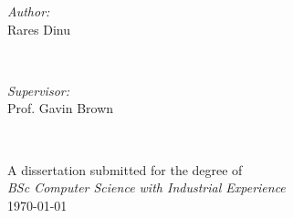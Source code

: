 \begin{titlepage}
\begin{minipage}{0.4\textwidth}
\begin{flushleft} \large
\emph{Author:}\\
Rares Dinu %
\end{flushleft}
\end{minipage}
~
\begin{minipage}{0.4\textwidth}
\begin{flushright} \large
\emph{Supervisor:} \\
Prof. Gavin Brown 
\end{flushright}
\end{minipage}\\[3cm]
\makeatother



{\large A dissertation submitted for the degree of}\\[0.2cm]
{\large \emph{BSc Computer Science with Industrial Experience}}\\[1cm]
{\large \today}\\[2cm] %

\vfill %

\end{titlepage}